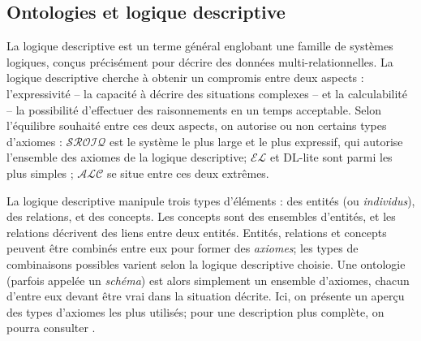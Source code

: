 \subsection{Ontologies et logique descriptive}

La logique descriptive est un terme général englobant une famille de systèmes logiques, conçus précisément pour décrire des données multi-relationnelles. La logique descriptive cherche à obtenir un compromis entre deux aspects : l'expressivité – la capacité à décrire des situations complexes – et la calculabilité – la possibilité d'effectuer des raisonnements en un temps acceptable. Selon l'équilibre souhaité entre ces deux aspects, on autorise ou non certains types d'axiomes : $\mathcal{SROIQ}$ \cite{horrocks2006sroiq} est le système le plus large et le plus expressif, qui autorise l'ensemble des axiomes de la logique descriptive; $\mathcal{EL}$ et DL-lite sont parmi les plus simples \cite{krotzsch2012owl}; $\mathcal{ALC}$ se situe entre ces deux extrêmes.




La logique descriptive manipule trois types d'éléments : des entités (ou \textit{individus}), des relations, et des concepts. Les concepts sont des ensembles d'entités, et les relations décrivent des liens entre deux entités. Entités, relations et concepts peuvent être combinés entre eux pour former des \textit{axiomes}; les types de combinaisons possibles varient selon la logique descriptive choisie. Une ontologie (parfois appelée un \textit{schéma}) est alors simplement un ensemble d'axiomes, chacun d'entre eux devant être vrai dans la situation décrite.
Ici, on présente un aperçu des types d'axiomes les plus utilisés; %
pour une description plus complète, on pourra consulter \cite{krotzsch2013description}. %


